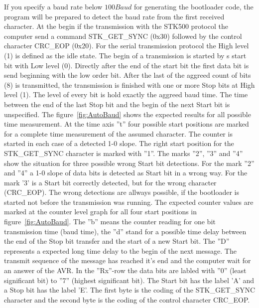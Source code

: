 If you specify a baud rate below \(100Baud\) for generating the bootloader code,
the program will be prepared to detect the baud rate from the first
received character.
At the begin if the transmission with the STK500 protocol the computer send
a command STK\_GET\_SYNC (0x30) followed by the control character CRC\_EOP (0x20).
For the serial transmission protocol the High level (1) is defined as the idle state.
The begin of a transmission is started by s start bit with Low level (0).
Directly after the end of the start bit the first data bit is send 
beginning with the low order bit. After the last of the aggreed count of bits (8)
is transmitted, the transmission is finished with one or more Stop bits at High level (1).
The level of every bit is hold exactly the aggreed baud time.
The time between the end of the last Stop bit and the begin of the next Start bit
is unspecified.
The figure~\ref{fig:AutoBaud} shows the expected results for all possible
time measurement. At the time axis ''t'' four possible start positions
are marked for a complete time measurement of the assumed character.
The counter is started in each case of a detected 1-0 slope.
The right start position for the STK\_GET\_SYNC character is marked with ''1''.
The marks ''2'', ''3'' and ''4'' show the situation for three possible
wrong Start bit detections.
For the mark ''2'' and ''4'' a 1-0 slope of data bits is detected as Start bit
in a wrong way. For the mark '3' is a Start bit correctly detected, but for the
wrong character (CRC\_EOP).
The wrong detections are allways possible, if the bootloader is started not
before the transmission was running.
The expected counter values are marked at the counter level graph for all
four start positions in figure~\ref{fig:AutoBaud}. 
The ''b'' means the counter reading for one bit transmission time (baud time),
the ''d'' stand for a possible time delay between the end of the Stop bit transfer 
and the start of a new Start bit.
The ''D'' represents a expected long time delay to the begin of the next message.
The transmit sequence of the message has reached it's end and the computer
wait for an answer of the AVR.
In the ''Rx''-row the data bits are labled with ''0'' (least significant bit)
to ''7'' (highest significant bit). The Start bit has the label 'A' and
a Stop bit has the label 'E'.
The first byte is the coding of the STK\_GET\_SYNC character and the second byte
is the coding of the control character CRC\_EOP.


